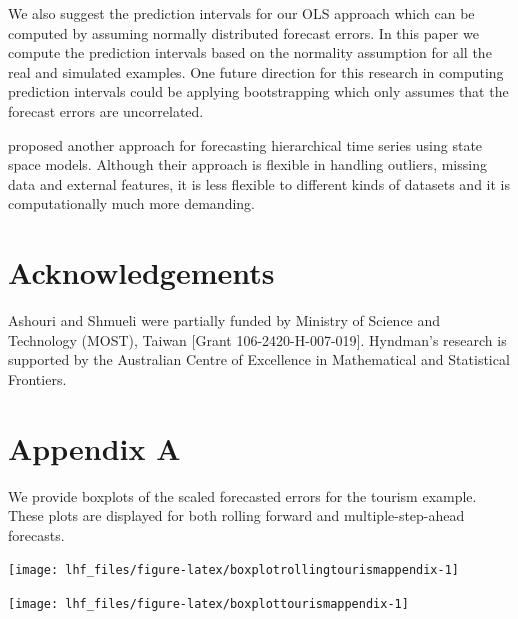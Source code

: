 \documentclass[11pt,a4paper,]{article}
\let\origfigure\figure
\let\endorigfigure\endfigure
\renewenvironment{figure}[1][2] {
    \expandafter\origfigure\expandafter[!htbp]
} {
    \endorigfigure
}
\begin{document}
We also suggest the prediction intervals for our OLS approach which can be computed by assuming normally distributed forecast errors. In this paper we compute the prediction intervals based on the normality assumption for all the real and simulated examples. One future direction for this research in computing prediction intervals could be applying bootstrapping which only assumes that the forecast errors are uncorrelated.

\textcite{pennings2017} proposed another approach for forecasting hierarchical time series using state space models. Although their approach is flexible in handling outliers, missing data and external features, it is less flexible to different kinds of datasets and it is computationally much more demanding.

\hypertarget{acknowledgements}{%
\section*{Acknowledgements}\label{acknowledgements}}

Ashouri and Shmueli were partially funded by Ministry of Science and Technology (MOST), Taiwan {[}Grant 106-2420-H-007-019{]}. Hyndman's research is supported by the Australian Centre of Excellence in Mathematical and Statistical Frontiers.

\clearpage

\hypertarget{appendixA}{%
\section*{Appendix A}\label{appendixA}}

We provide boxplots of the scaled forecasted errors for the tourism example. These plots are displayed for both rolling forward and multiple-step-ahead forecasts.

\begin{figure}

{\centering \texttt{[image: lhf\_files/figure-latex/boxplotrollingtourismappendix-1]} 

}

\caption{Box plots of scaled forecast errors from reconciled and unreconciled ETS, ARIMA and OLS methods at each hierarchical level for rolling origin 1-step-ahead tourism demand.}\label{fig:boxplotrollingtourismappendix}
\end{figure}

\begin{figure}

{\centering \texttt{[image: lhf\_files/figure-latex/boxplottourismappendix-1]} 

}

\caption{Box plots of scaled forecast errors from reconciled and unreconciled ETS, ARIMA and OLS methods at each hierarchical level for fixed origin multi-step-ahead tourism demand.}\label{fig:boxplottourismappendix}
\end{figure}
\end{document}
